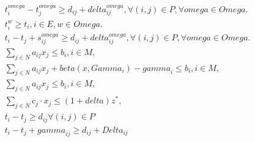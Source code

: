 \begin{align}
  & t_{i}^{\mathit{omega}} - t_{j}^{\mathit{omega}} \geq d_{\mathit{ij}} + \mathit{delta}_{\mathit{ij}}^{\mathit{omega}} , \forall \left(i , j\right) \in P , \forall \mathit{omega} \in \mathit{Omega} . \tag{eq\_0043} \\
  & t_{i}^{w} \geq t_{i} , i \in E , w \in \mathit{Omega} . \tag{eq\_0044} \\
  & t_{i} - t_{j} + s_{\mathit{ij}}^{\mathit{omega}} \geq d_{\mathit{ij}} + \mathit{delta}_{\mathit{ij}}^{\mathit{omega}} , \forall \left(i , j\right) \in P , \forall \mathit{omega} \in \mathit{Omega} . \tag{eq\_0045} \\
  & \sum_{j \in N} a_{\mathit{ij}} x_{j} \leq b_{i} , i \in M , \tag{eq\_0047} \\
  & \sum_{j \in N} a_{\mathit{ij}} x_{j} + \mathit{beta} \left(x , \mathit{Gamma}_{i}\right) - \mathit{gamma}_{i} \leq b_{i} , i \in M , \tag{eq\_0050} \\
  & \sum_{j \in N} a_{\mathit{ij}} x_{j} \leq b_{i} , i \in M , \tag{eq\_0051} \\
  & \sum_{j \in N} c_{j} \cdot x_{j} \leq \left(1 + \mathit{delta}\right) z^{*} , \tag{eq\_0052} \\
  & t_{i} - t_{j} \geq d_{\mathit{ij}} \forall \left(i , j\right) \in P \tag{eq\_0055} \\
  & t_{i} - t_{j} + \mathit{gamma}_{\mathit{ij}} \geq d_{\mathit{ij}} + \mathit{Delta}_{\mathit{ij}} \tag{eq\_0056\_a} \\
\end{align}
